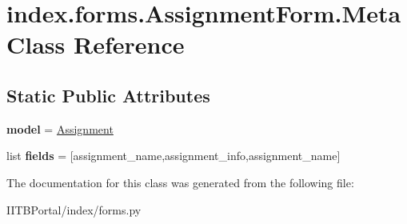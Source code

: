 \hypertarget{classindex_1_1forms_1_1AssignmentForm_1_1Meta}{}\section{index.\+forms.\+Assignment\+Form.\+Meta Class Reference}
\label{classindex_1_1forms_1_1AssignmentForm_1_1Meta}
\subsection*{Static Public Attributes}
\begin{DoxyCompactItemize}
\item 
\mbox{\label{classindex_1_1forms_1_1AssignmentForm_1_1Meta_abf78cb630160d5dbb3a6f4a1d2308b17}} 
{\bfseries model} = \hyperlink{classindex_1_1models_1_1Assignment}{Assignment}
\item 
\mbox{\label{classindex_1_1forms_1_1AssignmentForm_1_1Meta_a0c88b1f029ffe20fded16fcb9601b27f}} 
list {\bfseries fields} = \mbox{[}\textquotesingle{}assignment\+\_\+name\textquotesingle{},\textquotesingle{}assignment\+\_\+info\textquotesingle{},\textquotesingle{}assignment\+\_\+name\textquotesingle{}\mbox{]}
\end{DoxyCompactItemize}


The documentation for this class was generated from the following file\+:\begin{DoxyCompactItemize}
\item 
I\+I\+T\+B\+Portal/index/forms.\+py\end{DoxyCompactItemize}
